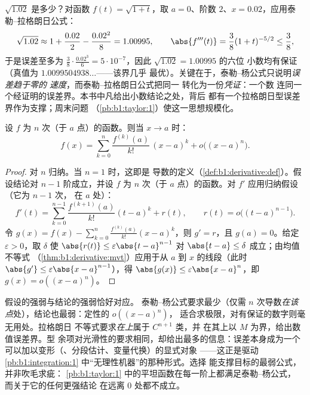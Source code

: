 \begin{example}[有保证的数值计算]\label{ex:b1:taylor:certified}
$\sqrt{1.02}$ 是多少？对函数 $f(t) =
\sqrt{1 + t}$，取 $a = 0$、阶数 $2$、$x = 0.02$，应用泰勒–拉格朗日公式：
\[
\sqrt{1.02} \approx 1 + \frac{0.02}{2} - \frac{0.02^2}{8}
= 1.00995 ,
\qquad
\abs{f'''(t)} = \frac{3}{8}(1+t)^{-5/2} \leq \frac 38 ,
\]
于是误差至多为 $\frac38 \cdot \frac{0.02^3}{6} =
5\cdot10^{-7}$，因此 $\sqrt{1.02} = 1.00995$ 的六位
小数均有保证（真值为 $1.0099504938\dots$——该界几乎
最优）。关键在于，泰勒–杨公式只说明\emph{误差趋于零的
速度}，而泰勒–拉格朗日公式把同一
转化为一份\emph{凭证}：一个数
连同一个经证明的误差界。本书中凡给出小数结论之处，背后
都有一个拉格朗日型误差界作为支撑；周末问题
（\cref{pb:b1:taylor:1}）使这一思想规模化。
\end{example}

\begin{theorem}[泰勒–杨公式]\label{thm:b1:taylor:young}
设 $f$ 为 $n$ 次（于 $a$ 点）的函数。则当 $x \to a$ 时：
\[
f(x) = \sum_{k=0}^{n} \frac{f^{(k)}(a)}{k!}\,(x-a)^k
+ o\bigl((x-a)^n\bigr) .
\]
\end{theorem}

\begin{proof}
对 $n$ 归纳。当 $n = 1$ 时，这即是
导数的定义（\cref{def:b1:derivative:def}）。假设结论对
$n - 1$ 阶成立，并设 $f$ 为 $n$ 次（于 $a$ 点）的函数。对
$f'$ 应用归纳假设（它为 $n-1$ 次，
在 $a$ 处）：
\[
f'(t) = \sum_{k=0}^{n-1} \frac{f^{(k+1)}(a)}{k!}(t-a)^k + r(t),
\qquad r(t) = o\bigl((t-a)^{n-1}\bigr).
\]
令 $g(x) = f(x) - \sum_{k=0}^{n} \frac{f^{(k)}(a)}{k!}(x-a)^k$，则
$g' = r$，且 $g(a) = 0$。给定 $\varepsilon > 0$，取 $\delta$
使 $\abs{r(t)} \leq \varepsilon\abs{t - a}^{n-1}$ 对 $\abs{t-a}
\leq \delta$ 成立；由均值不等式
（\cref{thm:b1:derivative:mvt}）应用于从 $a$ 到
$x$ 的线段（此时 $\abs{g'} \leq \varepsilon\abs{x-a}^{n-1}$），得
$\abs{g(x)} \leq \varepsilon\abs{x - a}^n$，即 $g(x) =
o((x-a)^n)$。
\end{proof}

\begin{remark}
假设的强弱与结论的强弱恰好对应。
泰勒–杨公式要求最少（仅需 $n$ 次导数\emph{在该
点}处），结论也最弱：定性的 $o((x-a)^n)$，
适合求极限，对有保证的数字则毫无用处。拉格朗日
不等式要求\emph{在上}属于 $C^{n+1}$ 类，并
在其上以 $M$ 为界，给出数值误差界。型
余项对光滑性的要求相同，却给出最多的信息：误差本身成为一个
可以加以变形（、分段估计、变量代换）的显式对象
——这正是驱动
\cref{pb:b1:integration:1} 中“无理性机器”的那种形式。选择
能支撑目标的最弱公式，并非吹毛求疵：
\cref{pb:b1:taylor:1} 中的平坦函数在每一阶上都满足泰勒–杨公式，
而关于它的任何更强结论
在远离 $0$ 处都不成立。
\end{remark}

